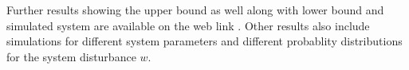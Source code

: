 \documentclass[12pt]{caltech_thesis_finalreport}
\begin{document}
Further results showing the upper bound as well along with lower bound and simulated system are available on the web link \cite{git}. Other results also include simulations for different system parameters and different probablity distributions for the system disturbance $w$. 
%
%		
%
\end{document}
